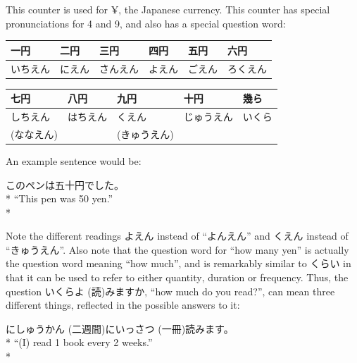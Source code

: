\documentclass[11pt, b5paper, twoside, openright, onecolumn]{book}
\makeatletter
\newcommand*{\rubystack}[2]{{\relscale{0.5}%
  \begin{tabular}[b]{@{}c@{}}%
    {#1}\\%
   {\textscale{2}{#2}}%
  \end{tabular}}%
}
\DeclareRobustCommand*{\ruby}[2]{%
  \mbox{%
    \setlength{\parskip}{0ex}%
    \BeginAccSupp{method=pdfstringdef,ActualText={#1}}%
      \rubystack{\phantom{#2}}{#1}%
      \llap{%
        \rubystack{#2}{\phantom{#1}}%
      }%
    \EndAccSupp{}%
  }%
}
\renewcommand*{\ruby}[2]{#2 (#1)}%
\newenvironment{exampleblock}{
\setlength{\parindent}{0.6in}
\begin{minipage}[t]{\dimexpr\textwidth-\parindent}}
{\end{minipage}}
\newenvironment{mytabular}[1]{\noindent\hspace{0.4in}
\begin{tabular}[h]{#1}}{\end{tabular}}
\makeatother
\begin{document}
This counter is used for ¥‚ the Japanese currency. This counter has special pronunciations for 4 and 9‚ and also has a special question word:

\vspace{0.5cm}
\smaller
\begin{mytabular}{| l  l  l  l  l  l |}\hline 
\rule{0pt}{2.4ex}一円 & 二円 & 三円 & 四円 & 五円 & 六円\\ 
\hline
\rule{0pt}{2.4ex}いちえん & にえん & さんえん & よえん & ごえん & ろくえん\\ 
\hline 
\end{mytabular}
\larger
\vspace{0.5cm}

\smaller
\begin{mytabular}{| l  l  l  l  l |}\hline 
\rule{0pt}{2.4ex}七円 & 八円 & 九円 & 十円 & 幾ら\\ 
\hline
\rule{0pt}{2.4ex}しちえん & はちえん & くえん & じゅうえん & いくら\\ 
\rule{0pt}{2.4ex}(ななえん) &  & (きゅうえん) &  & \\ 
\hline 
\end{mytabular}
\larger
\vspace{0.5cm}


An example sentence would be:

\vspace{0.4cm}
\begin{exampleblock}
このペンは五十円でした。 \\* 
“This pen was 50 yen.” \\* 
\end{exampleblock}
\vspace{0.2cm}

Note the different readings よえん instead of “よんえん” and くえん instead of “きゅうえん”. Also note that the question word for “how many yen” is actually the question word meaning “how much”‚ and is remarkably similar to くらい in that it can be used to refer to  either quantity‚ duration or frequency. Thus‚ the question いくら\ruby{読}{よ}みますか‚ “how much do you read?”‚ can mean three different things‚ reflected in the possible answers to it:

\vspace{0.4cm}
\begin{exampleblock}
\ruby{二週間}{にしゅうかん}に\ruby{一冊}{いっさつ}読みます。 \\* 
“(I) read 1 book every 2 weeks.” \\* 
\end{exampleblock}
\vspace{0.2cm}
\end{document}
